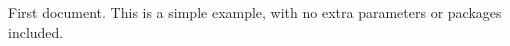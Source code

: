 \documentclass{article}
\begin{document}
First document. This is a simple example, with no
extra parameters or packages included.
\end{document}
